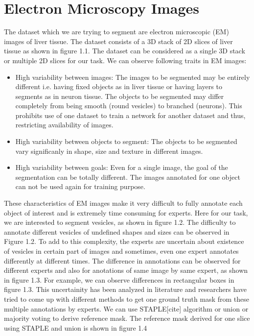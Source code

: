 \section{Electron Microscopy Images}
The dataset which we are trying to segment are electron microscopic (EM) images of liver tissue. The dataset consists of a 3D stack of 2D slices of liver tissue as shown in figure 1.1. The dataset can be considered as a single 3D stack or multiple 2D slices for our task. We can observe following traits in EM images:
\begin{itemize}
\item High variability between images: The images to be segmented may be entirely different i.e. having fixed objects as in liver tissue or having layers to segments as in neuron tissue. The objects to be segmented may differ completely from being smooth (round vesicles) to branched (neurons). This prohibits use of one dataset to train a network for another dataset and thus, restricting availability of images.
\item High variability between objects to segment: The objects to be segmented vary significanly in shape, size and texture in different images.
\item High variability between goals: Even for a single image, the goal of the segmentation can be totally different. The images annotated for one object can not be used again for training purpose.
\end{itemize}
These characteristics of EM images make it very difficult to fully annotate each object of interest and is extremely time consuming for experts. Here for our task, we are interested to segment vesicles, as shown in figure 1.2. The difficulty to annotate different vesicles of undefined shapes and sizes can be observed in Figure 1.2. To add to this complexity, the experts are uncertain about existence of vesicles in certain part of images and sometimes, even one expert annotates differently at different times. The difference in annotations can be observed for different experts and also for anotations of same image by same expert, as shown in figure 1.3. For example, we can observe differences in rectangular boxes in figure 1.3. This uncertainity has been analyzed in literature and researchers have tried to come up with different methods to get one ground truth mask from these multiple annotations by experts. We can use STAPLE[cite] algorithm or union or majority voting to derive reference mask. The reference mask derived for one slice using STAPLE and union is shown in figure 1.4\par



